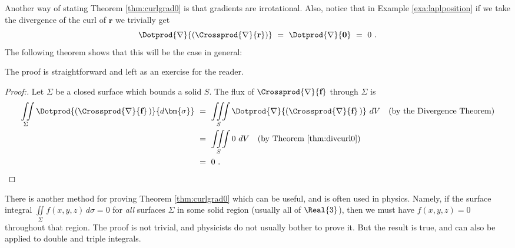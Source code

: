 
Another way of stating Theorem \ref{thm:curlgrad0} is that gradients are irrotational. Also,
notice that in Example \ref{exa:laplposition} if we take the divergence of the curl of $\textbf{r}$ we trivially get
\begin{displaymath}
 \Dotprod{\nabla}{(\Crossprod{\nabla}{\textbf{r}})} ~=~ \Dotprod{\nabla}{\textbf{0}} ~=~ 0 ~.
\end{displaymath}
The following theorem shows that this will be the case in general:

The proof is straightforward and left as an exercise for the reader.
\begin{proof}[Proof:]
 Let $\Sigma$ be a closed surface which bounds a solid $S$. The flux of $\Crossprod{\nabla}{\textbf{f}}$
 through $\Sigma$ is
 \begin{align*}
  \iint\limits_{\Sigma} \Dotprod{(\Crossprod{\nabla}{\textbf{f}}\,)}{d\bm{\sigma}} ~&=~
   \iiint\limits_{S} \Dotprod{\nabla}{(\Crossprod{\nabla}{\textbf{f}}\,)} ~dV\quad\text{(by the Divergence Theorem)}\\
   &=~ \iiint\limits_{S} 0 ~dV \quad\text{(by Theorem \ref{thm:divcurl0})}\\
   &=~ 0 ~.\hfill
 \end{align*}
\end{proof}\vspace{-3mm}

There is another method for proving Theorem \ref{thm:curlgrad0} which can be useful, and is often used in physics.
Namely, if the surface integral $\iint\limits_{\Sigma} f(x,y,z)\,d\sigma = 0$
for \emph{all} surfaces $\Sigma$ in some solid region (usually all of $\Real{3}$), then we must have $f(x,y,z) = 0$
throughout that region. The proof is not trivial, and physicists do not usually bother to prove it. But the result is
true, and can also be applied to double and triple integrals.


